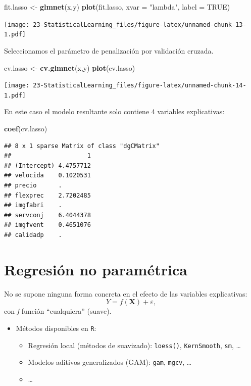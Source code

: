 \documentclass[]{book}
\newenvironment{Shaded}{\begin{snugshade}}{\end{snugshade}}
\newcommand{\KeywordTok}[1]{\textcolor[rgb]{0.13,0.29,0.53}{\textbf{#1}}}
\newcommand{\DataTypeTok}[1]{\textcolor[rgb]{0.13,0.29,0.53}{#1}}
\newcommand{\StringTok}[1]{\textcolor[rgb]{0.31,0.60,0.02}{#1}}
\newcommand{\OtherTok}[1]{\textcolor[rgb]{0.56,0.35,0.01}{#1}}
\newcommand{\NormalTok}[1]{#1}
\begin{document}
\begin{Shaded}
\begin{Highlighting}[]
\NormalTok{fit.lasso <-}\StringTok{ }\KeywordTok{glmnet}\NormalTok{(x,y)}
\KeywordTok{plot}\NormalTok{(fit.lasso, }\DataTypeTok{xvar =} \StringTok{"lambda"}\NormalTok{, }\DataTypeTok{label =} \OtherTok{TRUE}\NormalTok{)}
\end{Highlighting}
\end{Shaded}

\texttt{[image: 23-StatisticalLearning\_files/figure-latex/unnamed-chunk-13-1.pdf]}

Seleccionamos el parámetro de penalización por validación cruzada.

\begin{Shaded}
\begin{Highlighting}[]
\NormalTok{cv.lasso <-}\StringTok{ }\KeywordTok{cv.glmnet}\NormalTok{(x,y)}
\KeywordTok{plot}\NormalTok{(cv.lasso)}
\end{Highlighting}
\end{Shaded}

\texttt{[image: 23-StatisticalLearning\_files/figure-latex/unnamed-chunk-14-1.pdf]}

En este caso el modelo resultante solo contiene 4 variables
explicativas:

\begin{Shaded}
\begin{Highlighting}[]
\KeywordTok{coef}\NormalTok{(cv.lasso)}
\end{Highlighting}
\end{Shaded}

\begin{verbatim}
## 8 x 1 sparse Matrix of class "dgCMatrix"
##                     1
## (Intercept) 4.4757712
## velocida    0.1020531
## precio      .        
## flexprec    2.7202485
## imgfabri    .        
## servconj    6.4044378
## imgfvent    0.4651076
## calidadp    .
\end{verbatim}

\section{Regresión no paramétrica}\label{regresion-no-parametrica}

No se supone ninguna forma concreta en el efecto de las variables
explicativas: \[Y=f\left(  \mathbf{X}\right)  +\varepsilon,\] con
\emph{f} función ``cualquiera'' (suave).

\begin{itemize}
\item
  Métodos disponibles en \texttt{R}:

  \begin{itemize}
  \item
    Regresión local (métodos de suavizado): \texttt{loess()},
    \texttt{KernSmooth}, \texttt{sm}, \ldots{}
  \item
    Modelos aditivos generalizados (GAM): \texttt{gam}, \texttt{mgcv},
    \ldots{}
  \item
    \ldots{}
  \end{itemize}
\end{itemize}
\end{document}
